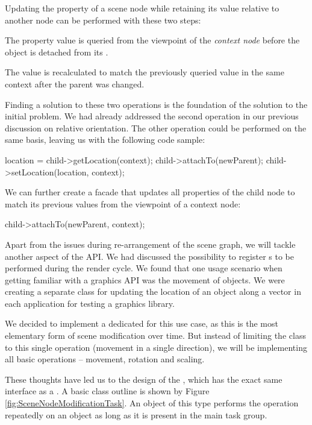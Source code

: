 	Updating the property of a scene node while retaining its value relative to another node can be performed with these two steps:

	\begin{smalllist}
		\item The property value is queried from the viewpoint of the \emph{context node} before the object is detached from its .
		\item The value is recalculated to match the previously queried value in the same context after the parent was changed.
	\end{smalllist}

	Finding a solution to these two operations is the foundation of the solution to the initial problem. We had already addressed the second operation in our previous discussion on relative orientation. The other operation could be performed on the same basis, leaving us with the following code sample:
	
	\begin{code}[2]
		location = child->getLocation(context);
		child->attachTo(newParent);
		child->setLocation(location, context);
	\end{code}

	We can further create a facade that updates all properties of the child node to match its previous values from the viewpoint of a context node:

	\begin{code}[2]
		child->attachTo(newParent, context);
	\end{code}

	Apart from the issues during re-arrangement of the scene graph, we will tackle another aspect of the API. We had discussed the possibility to register s to be performed during the render cycle. We found that one usage scenario when getting familiar with a graphics API was the movement of objects. We were creating a separate class for updating the location of an object along a vector in each application for testing a graphics library.

	We decided to implement a dedicated  for this use case, as this is the most elementary form of scene modification over time. But instead of limiting the class to this single operation (movement in a single direction), we will be implementing all basic operations -- movement, rotation and scaling.

	These thoughts have led us to the design of the , which has the exact same interface as a . A basic class outline is shown by Figure \ref{fig:SceneNodeModificationTask}. An object of this type performs the operation repeatedly on an object as long as it is present in the main task group.

